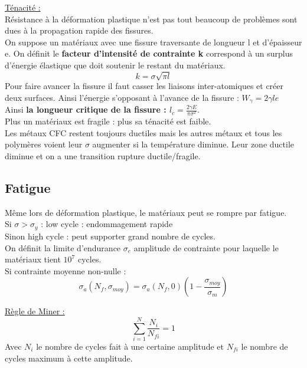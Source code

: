 \documentclass[../main.tex]{subfiles}
\begin{document}
\quad \underline{Ténacité :}\\
Résistance à la déformation plastique n'est pas tout beaucoup de problèmes sont dues à la propagation rapide des fissures. \\
On suppose un matériaux avec une fissure traversante de longueur l et d'épaisseur e. On définit le \textbf{facteur d'intensité de contrainte k} correspond à un surplus d'énergie élastique que doit soutenir le restant du matériaux. \\
\begin{equation}
    k = \sigma \sqrt{\pi l}
\end{equation}
Pour faire avancer la fissure il faut casser les liaisons inter-atomiques et créer deux surfaces. Ainsi l'énergie s'opposant à l'avance de la fissure : $W_{\gamma} = 2\gamma le$\\
Ainsi \textbf{la longueur critique de la fissure : $l_c = \frac{2\gamma E}{\pi \sigma^2}$}.\\
Plus un matériaux est fragile : plus sa ténacité est faible. \\
Les métaux CFC restent toujours ductiles mais les autres métaux et tous les polymères voient leur $\sigma$ augmenter si la température diminue. Leur zone ductile diminue et on a une transition rupture ductile/fragile.\\

\subsection{Fatigue}
Même lors de déformation plastique, le matériaux peut se rompre par fatigue. \\
Si $\sigma > \sigma_y$ : low cycle : endommagement rapide\\
Sinon high cycle : peut supporter grand nombre de cycles. \\
On définit la limite d'endurance $\sigma_e$ amplitude de contrainte pour laquelle le matériaux tient $10^7$ cycles.\\
Si contrainte moyenne non-nulle : \\
\begin{equation}
    \sigma_a (N_f, \sigma_{moy}) = \sigma_a(N_f, 0) (1-\frac{\sigma_{moy}}{\sigma_m})
\end{equation}


\quad \underline{Règle de Miner :}\\
\begin{equation}
    \sum_{i=1}^N \frac{N_i}{N_{fi}} = 1
\end{equation}
Avec $N_i$ le nombre de cycles fait à une certaine amplitude et $N_{fi}$ le nombre de cycles maximum à cette amplitude.\\
\end{document}
